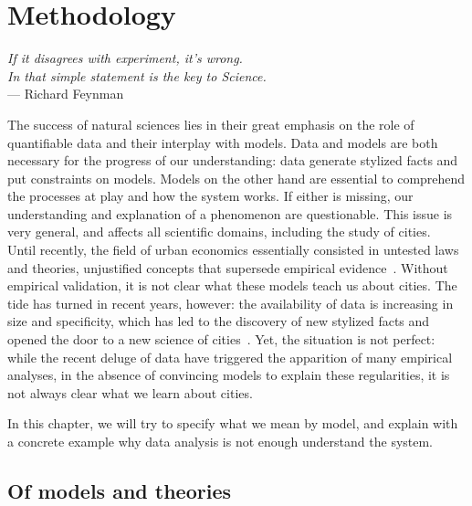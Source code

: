 

\chapter{Methodology}
\label{chap:methodology}

\begin{flushright}{\slshape    
If it disagrees with experiment, it's wrong.\\ 
In that simple statement is the key to Science.} \\ \medskip
--- Richard Feynman~\cite{Feynman:1965}
\end{flushright}


\bigskip

The success of natural sciences lies in their great emphasis on the role of
quantifiable data and their interplay with models. Data and models are both
necessary for the progress of our understanding: data generate stylized facts
and put constraints on models. Models on the other hand are essential to
comprehend the processes at play and how the system works. If either is missing,
our understanding and explanation of a phenomenon are questionable. This issue
is very general, and affects all scientific domains, including the study of
cities.\\

Until recently, the field of urban economics essentially consisted in untested
laws and theories, unjustified concepts that supersede empirical
evidence~\cite{Bouchaud:2008}. Without empirical validation, it is not clear
what these models teach us about cities. The tide has turned in recent years,
however: the availability of data is increasing in size and specificity, which
has led to the discovery of new stylized facts and opened the door to a new
science of cities~\cite{Batty:2013}. Yet, the situation is not perfect: while
the recent deluge of data have triggered the apparition of many empirical
analyses, in the absence of convincing models to explain these regularities, it
is not always clear what we learn about cities.

In this chapter, we will try to specify what we mean by model, and explain with
a concrete example why data analysis is not enough understand the system.


\section{Of models and theories}

